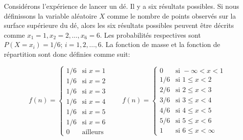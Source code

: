\begin{example}\label{exemple:4}
Considérons l'expérience de lancer un dé. Il y a six résultats possibles. Si nous définissons la variable aléatoire $X$
comme le nombre de points observés sur la surface supérieure du dé, alors les six résultats possibles peuvent être
décrits comme $x_1 = 1, x_2 = 2,\dots, x_6 = 6$. Les probabilités respectives sont $P (X = x_i) = 1/6$; $i = 1,2, ..., 6$.
La fonction de masse et la fonction de répartition sont donc définies comme suit:

\begin{equation}
f(n) = \begin{cases} 1/6 & \mbox{si   } x=1 \\1/6 & \mbox{si   } x=2 \\1/6 & \mbox{si   } x=3 \\1/6 & \mbox{si   } x=4 \\1/6 & \mbox{si   } x=5 \\1/6 & \mbox{si   } x=6 \\ 0 & \mbox{ailleurs } \end{cases}
\quad\mathrm{   }\quad
f(n) = \begin{cases} 0 & \mbox{si   } -\infty<x<1 \\1/6 & \mbox{si   } 1\leq x<2 \\2/6 & \mbox{si   } 2\leq x<3 \\3/6 & \mbox{si   } 3\leq x<4 \\4/6 & \mbox{si   } 4\leq x<5 \\5/6 & \mbox{si   } 5\leq x<6 \\ 1 & \mbox{si } 6\leq x<\infty \end{cases}
\end{equation}


\end{example}
